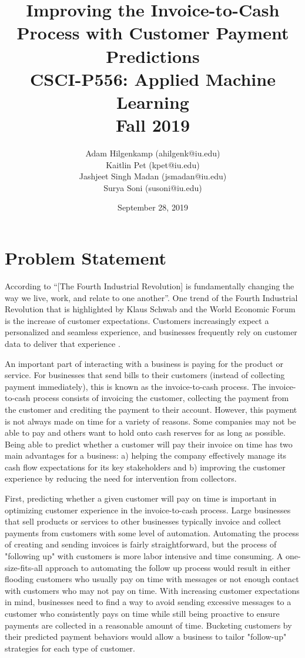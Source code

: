 \documentclass{article}
\title{Improving the Invoice-to-Cash Process with Customer Payment Predictions \\ CSCI-P556: Applied Machine Learning \\ Fall 2019}
\author{Adam Hilgenkamp (ahilgenk@iu.edu) \\ Kaitlin Pet (kpet@iu.edu) \\ Jashjeet Singh Madan (jsmadan@iu.edu) \\ Surya Soni (susoni@iu.edu)}
\date{September 28, 2019}
\begin{document}
\maketitle

\section{Problem Statement}
According to \citet[p.1]{schwab2016} \enquote{[The Fourth Industrial Revolution] is fundamentally changing the way we live, work, and relate to one another}. One trend of the Fourth Industrial Revolution that is highlighted by Klaus Schwab and the World Economic Forum is the increase of customer expectations.  Customers increasingly expect a personalized and seamless experience, and businesses frequently rely on customer data to deliver that experience \cite[p.53]{schwab2016}. 
\par
An important part of interacting with a business is paying for the product or service. For businesses that send bills to their customers (instead of collecting payment immediately), this is known as the invoice-to-cash process. The invoice-to-cash process consists of invoicing the customer, collecting the payment from the customer and crediting the payment to their account. However, this payment is not always made on time for a variety of reasons. Some companies may not be able to pay and others want to hold onto cash reserves for as long as possible. Being able to predict whether a customer will pay their invoice on time has two main advantages for a business: a) helping the company effectively manage its cash flow expectations for its key stakeholders and b) improving the customer experience by reducing the need for intervention from collectors.
\par
First, predicting whether a given customer will pay on time is important in optimizing customer experience in the invoice-to-cash process. Large businesses that sell products or services to other businesses typically invoice and collect payments from customers with some level of automation. Automating the process of creating and sending invoices is fairly straightforward, but the process of "following up" with customers is more labor intensive and time consuming. A one-size-fits-all approach to automating the follow up process would result in either flooding customers who usually pay on time with messages or not enough contact with customers who may not pay on time. With increasing customer expectations in mind, businesses need to find a way to avoid sending excessive messages to a customer who consistently pays on time while still being proactive to ensure payments are collected in a reasonable amount of time. Bucketing customers by their predicted payment behaviors would allow a business to tailor "follow-up" strategies for each type of customer. 
\end{document}
